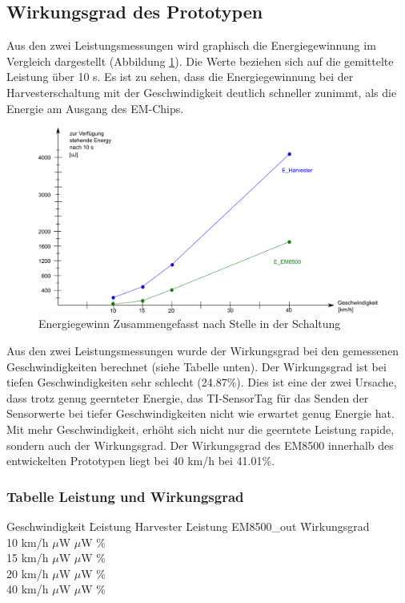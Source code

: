 \subsection{Wirkungsgrad des Prototypen}

Aus den zwei Leistungsmessungen wird graphisch die Energiegewinnung im Vergleich dargestellt (Abbildung \ref{zsmEnergyGewinn}). Die Werte beziehen sich auf die gemittelte Leistung über 10 s. Es ist zu sehen, dass die Energiegewinnung bei der Harvesterschaltung mit der Geschwindigkeit deutlich schneller zunimmt, als die Energie am Ausgang des EM-Chips. 

\begin{figure}[ht]
    \includegraphics[width=1\textwidth]{4Resultate/imag/EnergyGewinnNachStelle.png} 
    \caption{Energiegewinn Zusammengefasst nach Stelle in der Schaltung}
    \label{zsmEnergyGewinn}
\end{figure}

Aus den zwei Leistungsmessungen wurde der Wirkungsgrad bei den gemessenen Geschwindigkeiten berechnet (siehe Tabelle unten). Der Wirkungsgrad ist bei tiefen Geschwindigkeiten sehr schlecht (24.87\thinspace\%). Dies ist eine der zwei Ursache, dass trotz genug geernteter Energie, das TI-SensorTag für das Senden der Sensorwerte bei tiefer Geschwindigkeiten nicht wie erwartet genug Energie hat. Mit mehr Geschwindigkeit, erhöht sich nicht nur die geerntete Leistung rapide, sondern auch der Wirkungsgrad. Der Wirkungsgrad des EM8500 innerhalb des entwickelten Prototypen liegt bei 40 km/h  bei 41.01\thinspace\%.  

\subsubsection*{Tabelle Leistung und Wirkungsgrad }
\begin{tabbing}
    Geschwindigkeit \quad\= Leistung Harvester \quad\= Leistung EM8500\_out \quad\= Wirkungsgrad\\[0.8ex]
    10 km/h    $\mu$W    $\mu$W \thinspace\%  \\
    15 km/h    $\mu$W   $\mu$W \thinspace\%  \\
    20 km/h  $\mu$W   $\mu$W \thinspace\%  \\
    40 km/h  $\mu$W  $\mu$W \thinspace\%  \\
\end{tabbing}   



